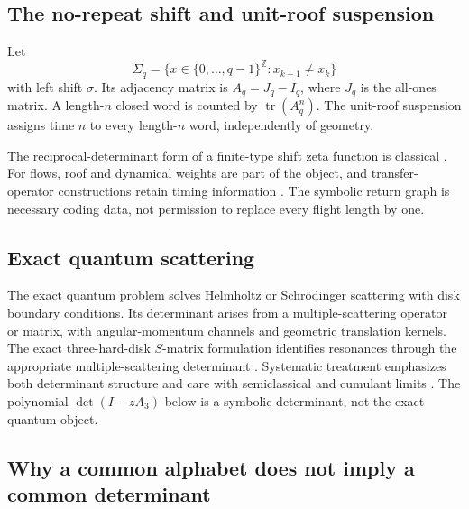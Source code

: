 \documentclass[11pt,a4paper]{article}
\theoremstyle{definition}
\theoremstyle{remark}
\newcommand{\tr}{\operatorname{tr}}
\begin{document}
\subsection{The no-repeat shift and unit-roof suspension}

Let
\[
 \Sigma_q=\{x\in\{0,\ldots,q-1\}^{\mathbb Z}:x_{k+1}\ne x_k\}
\]
with left shift \(\sigma\). Its adjacency matrix is \(A_q=J_q-I_q\), where \(J_q\) is the all-ones matrix. A length-\(n\) closed word is counted by \(\tr(A_q^n)\). The unit-roof suspension assigns time \(n\) to every length-\(n\) word, independently of geometry.

The reciprocal-determinant form of a finite-type shift zeta function is classical \citep[pp.~43--49]{BowenLanford1970}.
For flows, roof and dynamical weights are part of the object, and transfer-operator constructions retain timing information \citep[Secs.~1--3]{Ruelle1976}. The symbolic return graph is necessary coding data, not permission to replace every flight length by one.

\subsection{Exact quantum scattering}

The exact quantum problem solves Helmholtz or Schrödinger scattering with disk boundary conditions. Its determinant arises from a multiple-scattering operator or matrix, with angular-momentum channels and geometric translation kernels.
The exact three-hard-disk \(S\)-matrix formulation identifies resonances through the appropriate multiple-scattering determinant \citep[abstract and Secs.~II--III]{GaspardRice1989Exact}.
Systematic treatment emphasizes both determinant structure and care with semiclassical and cumulant limits \citep[Secs.~4--6]{Wirzba1999}. The polynomial \(\det(I-zA_3)\) below is a symbolic determinant, not the exact quantum object.

\subsection{Why a common alphabet does not imply a common determinant}
\end{document}

